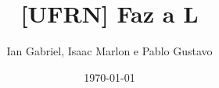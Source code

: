 \documentclass[landscape]{article}
\title{[UFRN] Faz a L}
\author{Ian Gabriel, Isaac Marlon e Pablo Gustavo}
\date{\today}
\begin{document}
\twocolumn
\maketitle
\tableofcontents
\end{document}
